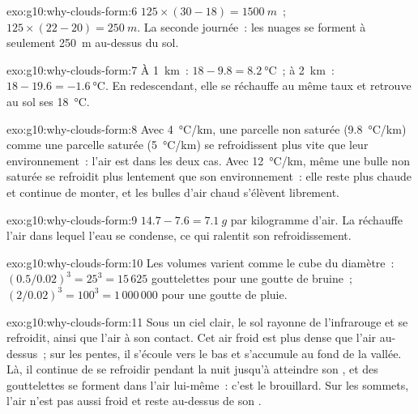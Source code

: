 \begin{solution}{exo:g10:why-clouds-form:6}
$125 \times (30 - 18) = \qty{1500}{m}$~; $125 \times (22 - 20) =
\qty{250}{m}$. La seconde journée~: les nuages se forment à seulement
\qty{250}{m} au-dessus du sol.
\end{solution}

\begin{solution}{exo:g10:why-clouds-form:7}
À \qty{1}{km}~: $18 - 9.8 = \qty{8.2}{\degreeCelsius}$~; à \qty{2}{km}~:
$18 - 19.6 = \qty{-1.6}{\degreeCelsius}$. En redescendant, elle se
réchauffe au même taux et retrouve au sol ses \qty{18}{\degreeCelsius}.
\end{solution}

\begin{solution}{exo:g10:why-clouds-form:8}
Avec \qty{4}{\degreeCelsius/km}, une parcelle non saturée
(\qty{9.8}{\degreeCelsius/km}) comme une parcelle saturée
(\qty{5}{\degreeCelsius/km}) se refroidissent plus vite que leur
environnement~: l'air est  dans les deux cas. Avec
\qty{12}{\degreeCelsius/km}, même une bulle non saturée se refroidit plus
lentement que son environnement~: elle reste plus chaude et continue de
monter, et les bulles d'air chaud s'élèvent librement.
\end{solution}

\begin{solution}{exo:g10:why-clouds-form:9}
$14.7 - 7.6 = \qty{7.1}{g}$ par kilogramme d'air. La 
réchauffe l'air dans lequel l'eau se condense, ce qui ralentit son
refroidissement.
\end{solution}

\begin{solution}{exo:g10:why-clouds-form:10}
Les volumes varient comme le cube du diamètre~: $(0.5/0.02)^3 = 25^3 = 15\,625$
gouttelettes pour une goutte de bruine~; $(2/0.02)^3 = 100^3 = 1\,000\,000$
pour une goutte de pluie.
\end{solution}

\begin{solution}{exo:g10:why-clouds-form:11}
Sous un ciel clair, le sol rayonne de l'infrarouge et se refroidit, ainsi
que l'air à son contact. Cet air froid est plus dense que l'air au-dessus~;
sur les pentes, il s'écoule vers le bas et s'accumule au fond de la vallée.
Là, il continue de se refroidir pendant la nuit jusqu'à atteindre son , et des gouttelettes se forment dans l'air lui-même~: c'est le
brouillard. Sur les sommets, l'air n'est pas aussi froid et reste au-dessus
de son .
\end{solution}

